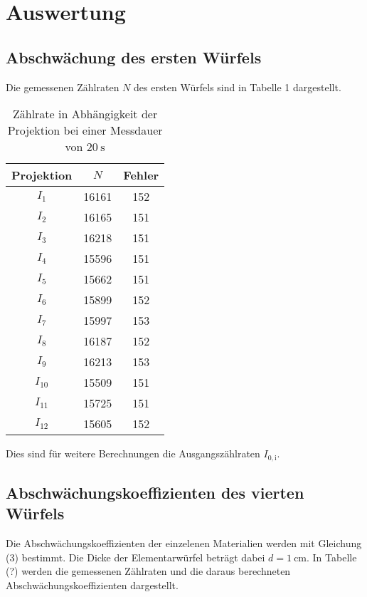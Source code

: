 \section{Auswertung}
\label{sec:Auswertung}




\subsection{Abschwächung des ersten Würfels}
Die gemessenen Zählraten $N$ des ersten Würfels sind in Tabelle 1 dargestellt.

\begin{table}[H]
  \centering
  \caption{Zählrate in Abhängigkeit der Projektion bei einer Messdauer von $\SI{20}{\second}$ }
  \label{tab:Parameter}
  \begin{tabular}{c c c}
    \toprule
    Projektion & $N$ & Fehler   \\
    \midrule
        $I_1$    & 16161 & 152    \\
        $I_2$    & 16165 & 151    \\
        $I_3$    & 16218 & 151    \\
        $I_4$    & 15596 & 151    \\
        $I_5$    & 15662 & 151    \\
        $I_6$    & 15899 & 152    \\
        $I_7$    & 15997 & 153    \\
        $I_8$    & 16187 & 152    \\
        $I_9$    & 16213 & 153    \\
        $I_{10}$ & 15509 & 151   \\
        $I_{11}$ & 15725 & 151    \\
        $I_{12}$ & 15605 & 152    \\
    \bottomrule
  \end{tabular}
\end{table}

Dies sind für weitere Berechnungen die Ausgangszählraten $I_{0,\mathrm{i}}$.




\subsection{Abschwächungskoeffizienten des vierten Würfels}
Die Abschwächungskoeffizienten der einzelenen Materialien werden mit Gleichung (3) bestimmt. Die Dicke
der Elementarwürfel beträgt dabei $d=\SI{1}{\centi\meter}$. In Tabelle (?) werden die gemessenen Zählraten und
die daraus berechneten Abschwächungskoeffizienten dargestellt.

